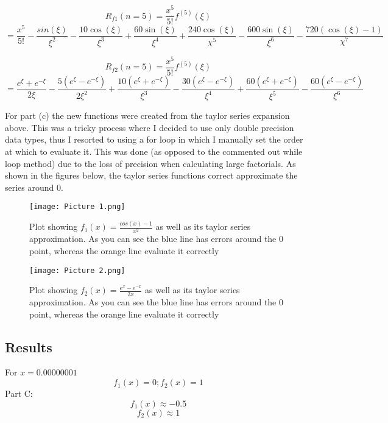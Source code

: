 \documentclass[12pt]{article}
\begin{document}
$$ R_{f1} (n=5) = \frac{x^5}{5!} f^{(5)} (\xi) $$
$$ = \frac{x^5}{5!} -\frac{sin(\xi)}{\xi^2}-\frac{10 \cos(\xi)}{\xi^3}+\frac{60 \sin(\xi)}{\xi^4}+\frac{240 \cos(\xi)}{\chi^5}-\frac{600 \sin(\xi)}{\xi^6} - \frac{720(\cos(\xi)-1)}{\chi^7} $$

$$ R_{f2} (n=5) = \frac{x^5}{5!} f^{(5)} (\xi) $$
$$ = \frac{e^{\xi} + e^{-\xi}}{2 \xi} - \frac{5(e^{\xi} - e^{-\xi})}{2 \xi^2} + \frac{10(e^{\xi} + e^{-\xi})}{\xi^3} - \frac{30(e^{\xi} - e^{-\xi})}{\xi^4} + \frac{60(e^{\xi} + e^{-\xi})}{\xi^5} - \frac{60(e^{\xi} - e^{-\xi})}{\xi^6} $$

For part (c) the new functions were created from the taylor series expansion above. This was a tricky process where I decided to use only double precision data types, thus I resorted to using a for loop in which I manually set the order at which to evaluate it. This was done (as opposed to the commented out while loop method) due to the loss of precision when calculating large factorials. 
As shown in the figures below, the taylor series functions correct approximate the series around 0. 

\begin{figure}[h]
    
    \texttt{[image: Picture 1.png]}
    \centering
    \caption{Plot showing $ f_1 (x) = \frac{cos(x) -1}{x^2} $ as well as its taylor series approximation. As you can see the blue line has errors around the 0 point, whereas the orange line evaluate it correctly}
\end{figure}

\begin{figure}[h]
    
    \texttt{[image: Picture 2.png]}
    \centering
    \caption{Plot showing $ f_2 (x) = \frac{e^x - e^{-x} }{2x} $ as well as its taylor series approximation. As you can see the blue line has errors around the 0 point, whereas the orange line evaluate it correctly}

\end{figure}

\subsection*{Results}
For $x=0.00000001$
$$ f_1 (x) = 0; f_2 (x) = 1 $$
Part C:
$$ f_1(x) \approx -0.5 $$
$$ f_2(x) \approx 1 $$ 
\end{document}
